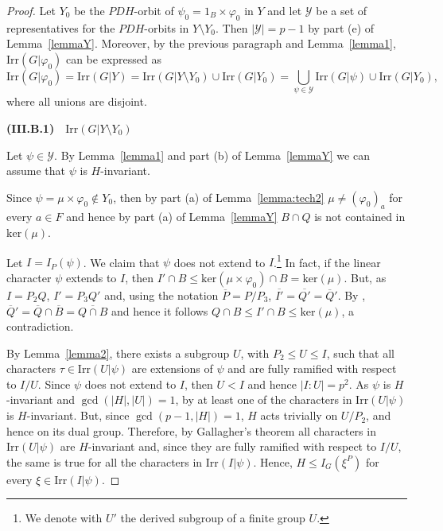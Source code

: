 \documentclass{amsart}
\def\irr#1{\mathrm{Irr}(#1)}
\begin{document}
\begin{proof}
Let  $Y_0$ be the $PDH$-orbit of $\psi_0 = 1_B \times \varphi_0$ in $Y$ and let $\mathcal{Y}$ be a set of representatives for the $PDH$-orbits in $Y \setminus Y_0$.
Then $|\mathcal{Y}| = p-1$ by part (e) of Lemma~\ref{lemmaY}. Moreover, by the previous paragraph and Lemma~\ref{lemma1}, $\irr{G|\varphi_0}$ can be expressed as
$$\irr{G|\varphi_0} = \irr{G|Y} =  \irr{G|Y \setminus Y_0} \cup \irr{G|Y_0} = \bigcup_{\psi \in \mathcal{Y}} \irr{G|\psi}  \cup  \irr{G|Y_0},$$
where all unions are disjoint.


 \medskip
{\bf (III.B.1)}~~$\irr{G|Y \setminus Y_0}$

 \smallskip
 Let  $\psi \in \mathcal{Y}$.
 By Lemma~\ref{lemma1}
 and part (b) of Lemma~\ref{lemmaY} we can assume that $\psi$ is $H$-invariant.


 Since $\psi = \mu \times \varphi_0 \not\in Y_0$,
 then by part (a) of Lemma~\ref{lemma:tech2} $\mu \neq (\varphi_0)_{a}$ for every $a \in F$  and hence
by part (a) of Lemma~\ref{lemmaY} $B \cap Q$ is not contained in $\mathrm{ker}(\mu)$.

Let $I=I_{P}(\psi)$. We claim  that $\psi$ does not extend to $I$.\footnote{We denote with $U'$ the derived subgroup of a finite group $U$.} In fact, if the linear character $\psi$ extends to $I$, then
$I'\cap B \leq \mathrm{ker}(\mu \times \varphi_0) \cap B = \mathrm{ker}(\mu)$.
But, as $I = P_2Q$, $I' = P_3Q'$ and, using the notation $\overline{P} = P/P_3$, $\overline{I'} = \overline{Q'} = \overline{Q}'$.
By \cite[Corollary 4.4]{isaacs1}, $\overline{Q}' = \overline{Q} \cap \overline{B} = \overline{Q \cap B}$ and hence
it follows $Q \cap B \leq I'\cap B \leq \mathrm{ker}(\mu)$, a contradiction.

By Lemma~\ref{lemma2}, there exists a subgroup $U$,  with  $P_2 \leq U \leq I$,   such
that all characters $\tau \in \irr{U|\psi}$ are extensions of  $\psi$ and are fully ramified with respect to $I/U$.
Since $\psi$ does not extend to $I$, then $U < I$ and hence $|I:U| = p^2$.
As $\psi$ is $H$-invariant and $\gcd(|H|, |U|) = 1$, by \cite[Corollary 13.30]{isaacs} at least one of the characters in $\irr{U|\psi}$ is $H$-invariant. But,  since $\gcd(p-1, |H|) = 1$, $H$ acts trivially on $U/P_2$, and hence on its dual group.
Therefore, by Gallagher's theorem all characters in $\irr{U|\psi}$ are $H$-invariant and, since they are fully ramified with respect to
$I/U$,  the same is true for all the characters  in $\irr{I|\psi}$.
Hence,  $H \leq I_G(\xi^P)$ for every $\xi \in \irr{I|\psi}$.



\end{proof}
\end{document}
